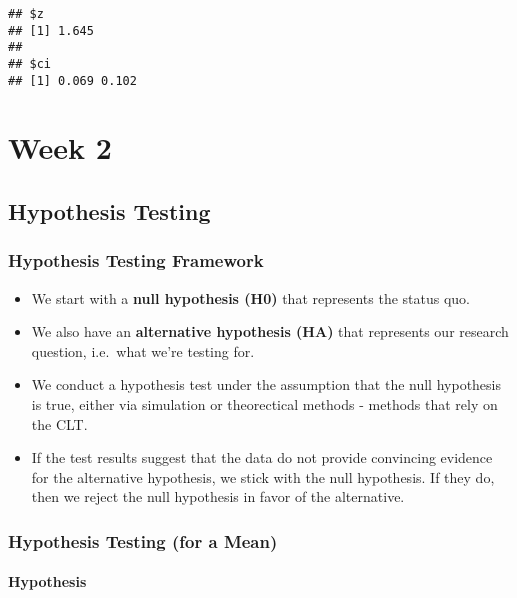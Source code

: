 \documentclass[]{book}
\providecommand{\tightlist}{%
  \setlength{\itemsep}{0pt}\setlength{\parskip}{0pt}}
\begin{document}
\begin{verbatim}
## $z
## [1] 1.645
## 
## $ci
## [1] 0.069 0.102
\end{verbatim}

\hypertarget{week-2}{%
\chapter*{Week 2}\label{week-2}}

\hypertarget{hypothesis-testing}{%
\section*{Hypothesis Testing}\label{hypothesis-testing}}

\hypertarget{hypothesis-testing-framework}{%
\subsection*{Hypothesis Testing Framework}\label{hypothesis-testing-framework}}

\begin{itemize}
\tightlist
\item
  We start with a \textbf{null hypothesis (H0)} that represents the status quo.
\item
  We also have an \textbf{alternative hypothesis (HA)} that represents our research question, i.e.~what we're testing for.
\item
  We conduct a hypothesis test under the assumption that the null hypothesis is true, either via
  simulation or theorectical methods - methods that rely on the CLT.
\item
  If the test results suggest that the data do not provide convincing evidence for the alternative
  hypothesis, we stick with the null hypothesis. If they do, then we reject the null hypothesis in
  favor of the alternative.
\end{itemize}

\hypertarget{hypothesis-testing-for-a-mean}{%
\subsection*{Hypothesis Testing (for a Mean)}\label{hypothesis-testing-for-a-mean}}

\hypertarget{hypothesis}{%
\subsubsection*{Hypothesis}\label{hypothesis}}
\end{document}
